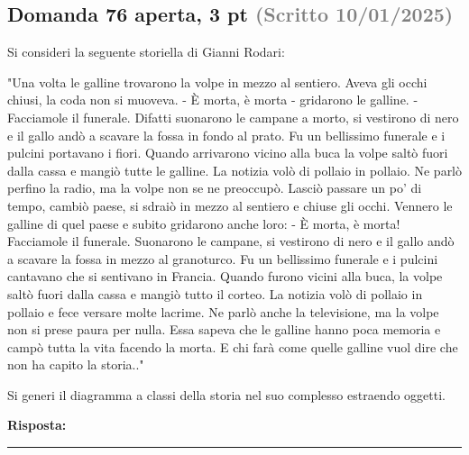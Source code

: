 \documentclass[a4paper,11pt]{article}
\begin{document}
\subsection*{Domanda 76 \hfill {\small aperta, 3 pt \textcolor{gray}{(Scritto 10/01/2025)}}}
\begin{tcolorbox}[colback=gray!8,colframe=gray!50,title=Contesto]
Si consideri la seguente storiella di Gianni Rodari:

"Una volta le galline trovarono la volpe in mezzo al sentiero. Aveva gli occhi chiusi, la coda non si muoveva. - È morta, è morta - gridarono le galline. - Facciamole il funerale. Difatti suonarono le campane a morto, si vestirono di nero e il gallo andò a scavare la fossa in fondo al prato. Fu un bellissimo funerale e i pulcini portavano i fiori. Quando arrivarono vicino alla buca la volpe saltò fuori dalla cassa e mangiò tutte le galline.
La notizia volò di pollaio in pollaio. Ne parlò perfino la radio, ma la volpe non se ne preoccupò. Lasciò passare un po' di tempo, cambiò paese, si sdraiò in mezzo al sentiero e chiuse gli occhi. Vennero le galline di quel paese e subito gridarono anche loro: - È morta, è morta! Facciamole il funerale.
Suonarono le campane, si vestirono di nero e il gallo andò a scavare la fossa in mezzo al granoturco. Fu un bellissimo funerale e i pulcini cantavano che si sentivano in Francia. Quando furono vicini alla buca, la volpe saltò fuori dalla cassa e mangiò tutto il corteo.
La notizia volò di pollaio in pollaio e fece versare molte lacrime. Ne parlò anche la televisione, ma la volpe non si prese paura per nulla. Essa sapeva che le galline hanno poca memoria e campò tutta la vita facendo la morta. E chi farà come quelle galline vuol dire che non ha capito la storia.."
\end{tcolorbox}
Si generi il diagramma a classi della storia nel suo complesso estraendo oggetti.

\vspace{0.2cm}
\noindent\textbf{Risposta:}\par
\vspace{4cm}\hrule


\end{document}
